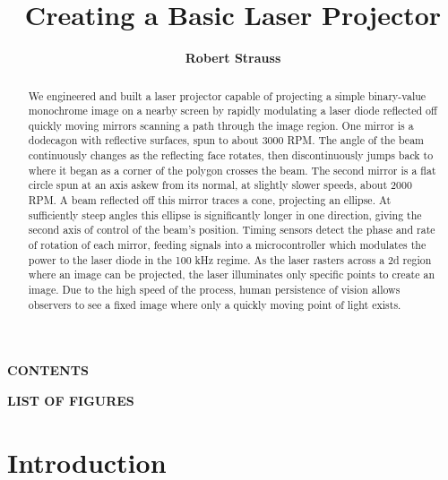 \documentclass[twocolumn]{revtex4-2}
\begin{document}
\title{Creating a Basic Laser Projector}


\author{\textbf{Robert Strauss}} 



\begin{abstract}

We engineered and built a laser projector  capable of projecting a simple binary-value monochrome image on a nearby screen by rapidly modulating a laser diode reflected off quickly moving mirrors scanning a path through the image region. One mirror is a dodecagon with reflective surfaces, spun to about 3000 RPM. The angle of the beam continuously changes as the reflecting face rotates, then discontinuously jumps back to where it began as a corner of the polygon crosses the beam. The second mirror is a flat circle spun at an axis askew from its normal, at slightly slower speeds, about 2000 RPM. A beam reflected off this mirror traces a cone, projecting an ellipse. At sufficiently steep angles this ellipse is significantly longer in one direction, giving the second axis of control of the beam's position. Timing sensors detect the phase and rate of rotation of each mirror, feeding signals into a microcontroller which modulates the power to the laser diode in the 100 kHz regime. As the laser rasters across a 2d region where an image can be projected, the laser illuminates only specific points to create an image. Due to the high speed of the process, human persistence of vision allows observers to see a fixed image where only a quickly moving point of light exists.
 
\end{abstract}

\maketitle    
\vspace*{0em}
\noindent\textbf{\large CONTENTS}\par
\vspace*{-2.5em}
\tableofcontents
\vspace*{3em}
\noindent\textbf{\large LIST OF FIGURES}\par
\vspace*{-2.5em}
\listoffigures


\section{Introduction}
\end{document}
